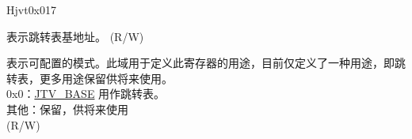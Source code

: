 \begin{register}{H}{jvt}{0x017}\label{regdesc:JVT}%
%
%
\regnewline%
\begin{regdesc}\begin{reglist}
\label{fielddesc:JVT_BASE}\item [BASE] 表示跳转表基地址。 (R/W)
\label{fielddesc:JVT_MODE}\item [MODE] 表示可配置的模式。此域用于定义此寄存器的用途，目前仅定义了一种用途，即跳转表，更多用途保留供将来使用。\\
0x0：\hyperref[fielddesc:JVT_BASE]{JTV\_BASE} 用作跳转表。\\
其他：保留，供将来使用\\
(R/W)
\end{reglist}\end{regdesc}
\end{register}

